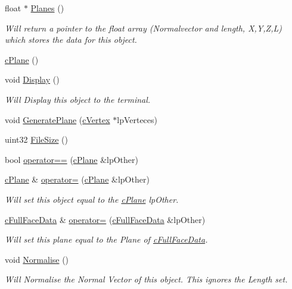 \begin{DoxyCompactItemize}
float $\ast$ \hyperlink{classc_plane_ab8867d00b550b475cf3893c12df0152d}{Planes} ()
\begin{DoxyCompactList}\small\item\em Will return a pointer to the float array (Normalvector and length, X,Y,Z,L) which stores the data for this object. \item\end{DoxyCompactList}\item 
\hyperlink{classc_plane_a34d029dbce52d65722a8a3ee6d11c580}{cPlane} ()
\item 
void \hyperlink{classc_plane_a5a1e7a6390968cc282d8dc6b9ca2efaa}{Display} ()
\begin{DoxyCompactList}\small\item\em Will Display this object to the terminal. \item\end{DoxyCompactList}\item 
void \hyperlink{classc_plane_a163a9169d136fadf6dad1d649ff49765}{GeneratePlane} (\hyperlink{classc_vertex}{cVertex} $\ast$lpVerteces)
\item 
uint32 \hyperlink{classc_plane_a5407e895294adb499267cc99d3448fae}{FileSize} ()
\item 
bool \hyperlink{classc_plane_af76bc2ef9316f355547f5d2fa6731515}{operator==} (\hyperlink{classc_plane}{cPlane} \&lpOther)
\item 
\hyperlink{classc_plane}{cPlane} \& \hyperlink{classc_plane_ad199c7cd692c0512a7b4ae7787ac49fc}{operator=} (\hyperlink{classc_plane}{cPlane} \&lpOther)
\begin{DoxyCompactList}\small\item\em Will set this object equal to the \hyperlink{classc_plane}{cPlane} lpOther. \item\end{DoxyCompactList}\item 
\hyperlink{classc_full_face_data}{cFullFaceData} \& \hyperlink{classc_plane_a6fdd170391a906ae3387eec280198cf5}{operator=} (\hyperlink{classc_full_face_data}{cFullFaceData} \&lpOther)
\begin{DoxyCompactList}\small\item\em Will set this plane equal to the Plane of \hyperlink{classc_full_face_data}{cFullFaceData}. \item\end{DoxyCompactList}\item 
void \hyperlink{classc_plane_a0b21c98214762e53d072962a16eb39cf}{Normalise} ()
\begin{DoxyCompactList}\small\item\em Will Normalise the Normal Vector of this object. This ignores the Length set. \item\end{DoxyCompactList}\item 

\end{DoxyCompactItemize}
